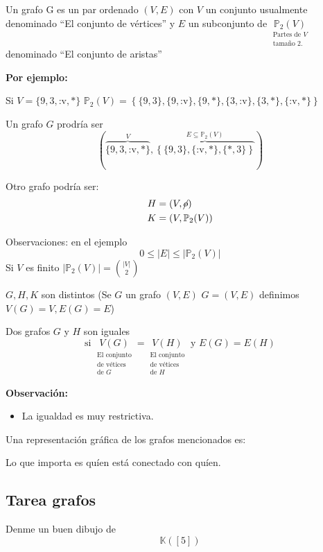 \documentclass[../main.tex]{subfiles}
\begin{document}
Un grafo G es un par ordenado $(V,E)$ con $V$ un conjunto usualmente denominado
``El conjunto de vértices'' y $E$ un subconjunto de
\(
	\underset
	{
		\substack
		{
			\text{Partes de $V$}\\
			\text{tamaño 2.}
		}
	}
	{
		\mathbb{P}_2(V)
	}
\)
denominado ``El conjunto de aristas''


\textbf{Por ejemplo:}

Si $V=\{9,3,\text{:v},*\}$
$\mathbb{P}_2(V)=
\left\{
	\{9,3\}
	,\{9,\text{:v}\}
	,\{9,*\}
	,\{3,\text{:v}\}
	,\{3,*\}
	,\{\text{:v},*\}
\right\} $

Un grafo $G$ prodría ser
\[
\left(
	\overbrace
	{
		\{9,3,\text{:v},*\}
	}^
	{
		V
	}
	,
	\overbrace
	{
		\left\{
			\{9,3\}
			,\{\text{:v},*\}
			,\{*,3\}
		\right\}
	}^
	{
		E \subseteq \mathbb{P}_2(V)
	}
\right)
\]

Otro grafo podría ser:
\begin{align*}
	H &= \left( V, \cancel{o} \right)\\
	K &= \left( V, \mathbb{P}_2(V) \right)
\end{align*}

Observaciones: en el ejemplo
\[
	0 \leq |E| \leq \left| \mathbb{P}_2(V) \right|
\]
Si $V$ es finito $ \left| \mathbb{P}_2(V) \right| = \binom{|V|}{2}$

$G,H,K$ son distintos
(Se $G$ un grafo $(V,E)$ $G=(V,E)$ definimos $V(G)=V, E(G)=E$)

Dos grafos $G$ y $H$ son iguales
\[
	\text{si }
	\underset
	{
		\substack
		{
			\text{El conjunto}\\
			\text{de vétices}\\
			\text{de $G$}
		}
	}
	{
		V(G)
	}
	=
	\underset
	{
		\substack
		{
			\text{El conjunto}\\
			\text{de vétices}\\
			\text{de $H$}
		}
	}
	{
		V(H)
	}
	\text{ y }
	E(G) = E(H)
\]

\textbf{Observación:}
\begin{itemize}
	\item La igualdad es muy restrictiva.
\end{itemize}

Una representación gráfica de los grafos mencionados es:

\begin{figure}[H]
	\centering
	
\end{figure}

Lo que importa es quíen está conectado con quíen.

\begin{figure}[H]
	\centering
	
\end{figure}

\subsection{Tarea grafos}%
\label{sub:tarea_grafos}

Denme un buen dibujo de
\[
	\mathbb{K}([5])
\]
\end{document}

